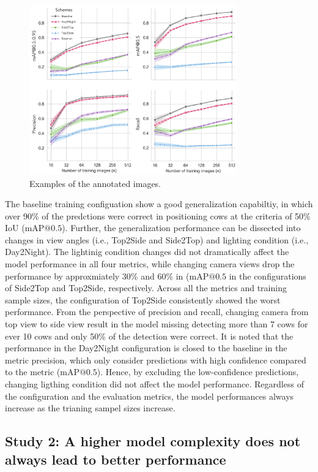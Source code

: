 \begin{figure}[h]
    \centering
    \includegraphics[width=0.8\textwidth]{figure_3.jpg}
    \caption{Examples of the annotated images.}
    \label{fig:schemes}
\end{figure}

The baseline training configuation show a good generalization capabiltiy, in which over 90\% of the predctions were correct in positioning cows at the criteria of 50\% IoU ($\text{mAP@{0.5}}$). Further, the generalization performance can be dissected into changes in view angles (i.e., Top2Side and Side2Top) and lighting condition (i.e., Day2Night). The lightinig condition changes did not dramatically affect the model performance in all four metrics, while changing camera views drop the performance by approxmiately 30\% and 60\% in ($\text{mAP@{0.5}}$ in the configurations of Side2Top and Top2Side, respectively. Across all the metrics and training sample sizes, the configuration of Top2Side consistently showed the worst performance. From the perspective of precision and recall, changing camera from top view to side view result in the model missing detecting more than 7 cows for ever 10 cows and only 50\% of the detection were correct. It is noted that the performance in the Day2Night configuration is closed to the baseline in the metric precision, which only consider predictions with high confidence compared to the metric ($\text{mAP@{0.5}}$). Hence, by excluding the low-confidence predictions, changing ligthing condition did not affect the model performance. Regardless of the configuration and the evaluation metrics, the model performances always increase as the trianing sampel sizes increase.


\subsection*{Study 2: A higher model complexity does not always lead to better performance}


